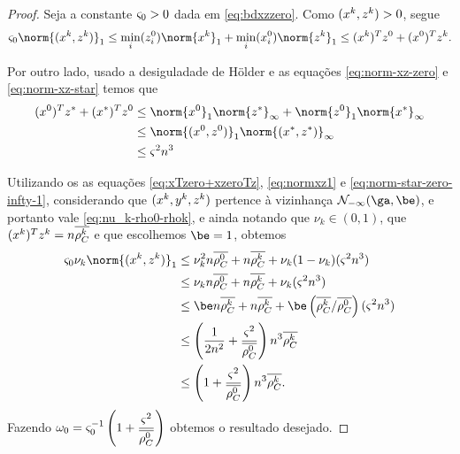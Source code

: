 \begin{proof}
Seja a constante $\varsigma_{0}>0$ dada em \eqref{eq:bdxzzero}. Como  $(x^{k},z^{k})>0$, segue 
\begin{equation}
	\label{eq:normxz1}
	\bdxzzero\norm{(\xk,\zk)}_{1} \leq \min_{i}(\zzero_{i})\norm{\xk}_{1} + \min_{i}(\xzero_{i})\norm{\zk}_{1}\leq
(\xk)^{T}\zzero + (\xzero)^{T}\zk.
\end{equation}

Por outro lado, usado a desiguladade de Hölder e as equações \eqref{eq:norm-xz-zero} e \eqref{eq:norm-xz-star}  temos que 
	\begin{align}
	(\xzero)^{T}\zstar + (\xstar)^{T}\zzero  & \leq \norm{\xzero}_{1}\norm{\zstar}_{\infty} + \norm{\zzero}_{1}\norm{\xstar}_{\infty} \notag \\
	& \leq \norm{(\xzero,\zzero)}_1 \norm{(\xstar,\zstar)}_{\infty} \notag \\
	&  \leq \bdxzstar^{2} n^3 \label{eq:norm-star-zero-infty-1} 
	\end{align}



Utilizando os as equações \eqref{eq:xTzero+xzeroTz},  \eqref{eq:normxz1} e \eqref{eq:norm-star-zero-infty-1}, considerando que $(x^{k},y^{k},z^{k})$ pertence à vizinhança $\Nset_{-\infty}(\ga,\be)$, e portanto vale  \eqref{eq:nu_k-rho0-rhok}, e ainda notando que  $\nu_k\in(0,1)$, que $(x^{k})^{T}z^{k} = n\overline{\rho_{C}^{k}}$ e que escolhemos $\be=1$, obtemos
\begin{align*}
	\bdxzzero\nu_k\norm{(\xk,\zk)}_{1} &\leq \nu_k^{2}n\dbvec{\rho_C^0} + n\dbvec{\rho_C^{k}} + \nu_k(1-\nu_k)(\bdxzstar^{2} n^3 ) \\ 
								&\leq \nu_k n\dbvec{\rho_C^0}+ n\dbvec{\rho_C^{k}} + \nu_k(\bdxzstar^{2} n^3 ) \\ 
								&\leq \be n\dbvec{\rho_C^{k}}+ n\dbvec{\rho_C^{k}} + \be\left(\dbvec{\rho_C^{k}}/\dbvec{\rho_C^{0}}\right)(\bdxzstar^{2} n^3  ) \\	
								&\leq \left(\frac{1}{2n^{2}}  + \frac{\bdxzstar^{2}}{\dbvec{\rho_C^{0}}}\right)  n^{3}\dbvec{\rho_C^{k}} \\
								&  \leq \left(1  + \frac{\bdxzstar^{2}}{\dbvec{\rho_C^{0}}}\right)  n^{3}\dbvec{\rho_C^{k}}.								
\end{align*}
Fazendo $\omega_{0} = \varsigma_{0}^{-1}\left(1  + \dfrac{\varsigma^{2}}{\overline{\rho_C^{0}}}\right)$ obtemos o resultado desejado.
\end{proof}





